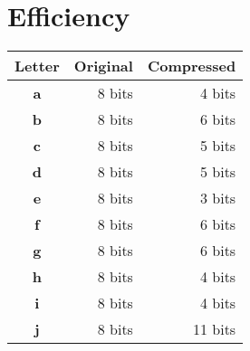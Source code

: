 \documentclass{article}
\begin{document}
    \section{Efficiency}
    \begin{minipage}[t]{.5\textwidth}
        \null \vfill
        \centering
        \begin{tabular}{|c|r|r|}
            \hline
            \textbf{\small Letter}                  & \multicolumn{1}{c|}{\textbf{\small Original}} & \multicolumn{1}{c|}{\textbf{\small Compressed}} \\ \hline
            \textbf{a}                              & 8 bits                                        & 4 bits                                               \\ \hline
            \textbf{b}                              & 8 bits                                        & 6 bits                                               \\ \hline
            \textbf{c}                              & 8 bits                                        & 5 bits                                               \\ \hline
            \textbf{d}                              & 8 bits                                        & 5 bits                                               \\ \hline
            \textbf{e}                              & 8 bits                                        & 3 bits                                               \\ \hline
            \textbf{f}                              & 8 bits                                        & 6 bits                                               \\ \hline
            \textbf{g}                              & 8 bits                                        & 6 bits                                               \\ \hline
            \textbf{h}                              & 8 bits                                        & 4 bits                                               \\ \hline
            \textbf{i}                              & 8 bits                                        & 4 bits                                               \\ \hline
            \textbf{j}                              & 8 bits                                        & 11 bits                                              \\ \hline

\end{tabular}
\end{minipage}
\end{document}
